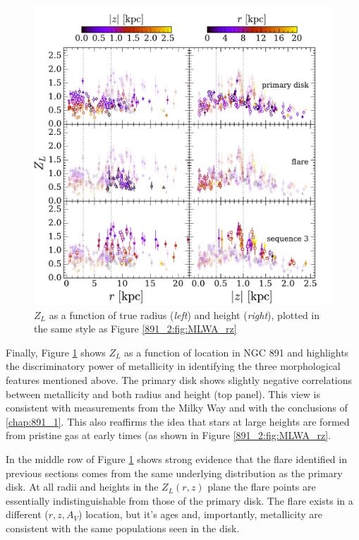 \begin{figure}
  \centering
  \includegraphics[width=\textwidth]{891_2/figs/MLWZ_rz_all.pdf}
  \caption[$Z_L$ vs
    ($r,|z|$)]{\fixspacing\label{891_2:fig:MLWZ_rz}$Z_L$ as a function
    of true radius (\emph{left}) and height (\emph{right}), plotted in
    the same style as Figure \ref{891_2:fig:MLWA_rz}}
\end{figure}

Finally, Figure \ref{891_2:fig:MLWZ_rz} shows $Z_L$ as a function of
location in NGC 891 and highlights the discriminatory power of
metallicity in identifying the three morphological features mentioned
above. The primary disk shows slightly negative correlations
between metallicity and both radius and height (top panel). This view
is consistent with measurements from the Milky Way \citep{Bovy12,
  Hayden14} and with the conclusions of
\ref{chap:891_1}. This also reaffirms the idea that stars at
large heights are formed from pristine gas at early times (as shown in
Figure \ref{891_2:fig:MLWA_rz}.

In the middle row of Figure \ref{891_2:fig:MLWZ_rz} shows strong evidence
that the flare identified in previous sections comes from the same
underlying distribution as the primary disk. At all radii and heights
in the $Z_L(r,z)$ plane the flare points are essentially
indistinguishable from those of the primary disk. The flare exists in
a different ($r,z,A_V$) location, but it's ages and, importantly,
metallicity are consistent with the same populations seen in the disk.

